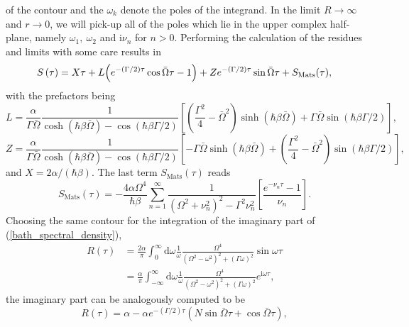of the contour and the $\omega_k$ denote the poles of the integrand. In the limit $R\rightarrow\infty$
and $r\rightarrow 0$, we will pick-up all of the poles which lie in the upper complex half-plane,
namely $\omega_1, \ \omega_2$ and $\text{i}\nu_n$ for $n > 0$. Performing the calculation 
of the residues and limits with some care results in
%
\begin{equation}
    S \left( \tau \right) = X\tau + L \Bigl( e^{-(\Gamma/2)\tau} \cos\bar{\Omega}\tau -1 \Bigr)
    + Z e^{-(\Gamma/2)\tau} \sin\bar{\Omega}\tau + S_{\text{Mats}}(\tau),
\end{equation}
%
with the prefactors being
%
\begin{equation}
    L = \frac{\alpha}{\Gamma\bar{\Omega}} \frac{1}{\cosh(\hbar\beta\bar{\Omega})-\cos(\hbar\beta\Gamma/2)}
    \left[ \left( \frac{\Gamma^2}{4}-\bar{\Omega}^2 \right) \sinh(\hbar\beta\bar{\Omega})
    + \Gamma\bar{\Omega} \sin(\hbar\beta\Gamma/2)  \right],
\end{equation}
%
\begin{equation}
    Z = \frac{\alpha}{\Gamma\bar{\Omega}} \frac{1}{\cosh(\hbar\beta\bar{\Omega})-\cos(\hbar\beta\Gamma/2)}
    \left[ -\Gamma\bar{\Omega} \sinh(\hbar\beta\bar{\Omega})
    + \left( \frac{\Gamma^2}{4}-\bar{\Omega}^2 \right) \sin(\hbar\beta\Gamma/2)  \right],
\end{equation}
%
and $X=2\alpha/(\hbar\beta)$. The last term $S_{\text{Mats}}(\tau)$ reads
%
\begin{equation}
    S_{\text{Mats}}(\tau) = -\frac{4\alpha\Omega^4}{\hbar\beta}
    \sum_{n=1}^{\infty}\frac{1}{(\Omega^2+\nu_n^2)^2-\Gamma^2\nu_n^2}
    \left[ \frac{e^{-\nu_n\tau}-1}{\nu_n} \right].
\end{equation}
%
Choosing the same contour for the integration of the imaginary part of (\ref{bath_spectral_density}),
%
\begin{align}
    R(\tau) &= \frac{2 \alpha}{\pi} 
    \int_{0}^{\infty} \text{d}\omega \frac{1}{\omega} \frac{\Omega^4}{\left(\Omega^2-\omega^2\right)^2
    + \left(\Gamma\omega\right)^2}\sin\omega\tau \\
    &= \frac{\alpha}{\pi} 
    \int_{-\infty}^{\infty} \text{d}\omega \frac{1}{\omega} \frac{\Omega^4}{\left(\Omega^2-\omega^2\right)^2
    + \left(\Gamma\omega\right)^2}e^{\text{i}\omega\tau},
\end{align}
%
the imaginary part can be analogously computed to be
%
\begin{equation}
    R(\tau) = \alpha - \alpha e^{-(\Gamma/2)\tau} \left( N\sin\bar{\Omega}\tau +\cos\bar{\Omega}\tau \right),
\end{equation}
